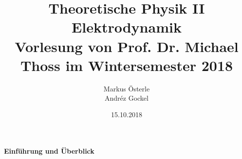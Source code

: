 \documentclass[titlepage,11pt,a4paper,ngerman]{report}
\begin{document}
	

\title{
	{\Huge Theoretische Physik II\\[3pt]Elektrodynamik}\\[1em]
	{\Large Vorlesung von Prof. Dr. Michael Thoss im Wintersemester 2018}}
\author{Markus Österle\\ Andréz Gockel}
\date{15.10.2018}
\maketitle
\tableofcontents



\pagebreak
\noindent
\begin{Huge}
	\textbf{Einführung und Überblick} \\[5pt]
\end{Huge}


\end{document}
